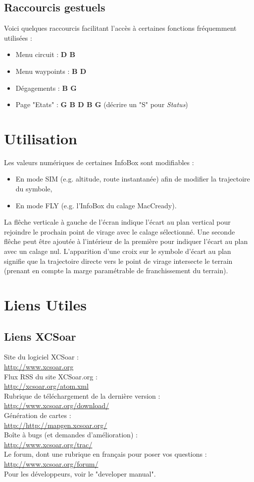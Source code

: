 \documentclass{article}
\begin{document}
\subsection{Raccourcis gestuels}
\noindent
%
Voici quelques raccourcis facilitant l'accès à certaines fonctions fréquemment utilisées :
\begin{itemize}
\item Menu circuit : \textbf{D B}
\item Menu waypoints : \textbf{B D}
\item Dégagements : \textbf{B G}
\item Page "Etats" : \textbf{G B D B G} (décrire un "S" pour \textit{Status})
\end{itemize}
%
\section{Utilisation}
\noindent
Les valeurs numériques de certaines InfoBox sont modifiables :
\begin{itemize}
\item  En mode SIM (e.g. altitude, route instantanée) afin de modifier la trajectoire du symbole,
\item En mode FLY (e.g. l'InfoBox du calage MacCready).
\end{itemize}
La flêche verticale à gauche de l'écran indique l'écart au plan vertical pour rejoindre le prochain point de virage avec le calage sélectionné. Une seconde flêche peut être ajoutée à l'intérieur de la première pour indiquer l'écart au plan avec un calage nul. L'apparition d'une croix sur le symbole d'écart au plan signifie que la trajectoire directe vers le point de virage intersecte le terrain (prenant en compte la marge paramétrable de franchissement du terrain).\\
\section{Liens Utiles}
\subsection{Liens XCSoar}
\noindent
\begin{flushleft}
Site du logiciel XCSoar :\\
\url{http://www.xcsoar.org}\\
Flux RSS du site XCSoar.org :\\
\url{http://xcsoar.org/atom.xml}\\
Rubrique de téléchargement de la dernière version :\\ \url{http://www.xcsoar.org/download/}\\
Génération de cartes :\\
\url{http://http://mapgen.xcsoar.org/}\\
Boîte à bugs (et demandes d'amélioration) :\\ \url{http://www.xcsoar.org/trac/}\\
Le forum, dont une rubrique en français pour poser vos questions :\\
\url{http://www.xcsoar.org/forum/}\\
Pour les développeurs, voir le "developer manual".
\end{flushleft}
%
\end{document}
